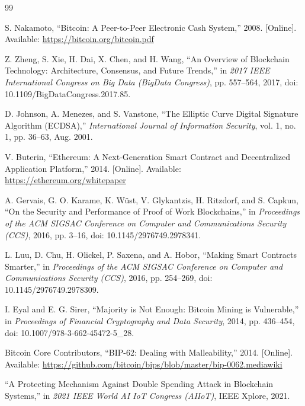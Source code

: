 \documentclass[12pt,a4paper]{report}
\begin{document}
\begin{thebibliography}{99}

S. Nakamoto, ``Bitcoin: A Peer-to-Peer Electronic Cash System,'' 2008.
[Online]. Available: \url{https://bitcoin.org/bitcoin.pdf}

Z. Zheng, S. Xie, H. Dai, X. Chen, and H. Wang,
``An Overview of Blockchain Technology: Architecture, Consensus, and Future Trends,''
in \textit{2017 IEEE International Congress on Big Data (BigData Congress)},
pp. 557--564, 2017, doi: 10.1109/BigDataCongress.2017.85.

D. Johnson, A. Menezes, and S. Vanstone,
``The Elliptic Curve Digital Signature Algorithm (ECDSA),''
\textit{International Journal of Information Security},
vol. 1, no. 1, pp. 36--63, Aug. 2001.

V. Buterin, ``Ethereum: A Next-Generation Smart Contract and Decentralized Application
Platform,'' 2014. [Online]. Available: \url{https://ethereum.org/whitepaper}

A. Gervais, G. O. Karame, K. W\"{u}st, V. Glykantzis, H. Ritzdorf, and S. Capkun,
``On the Security and Performance of Proof of Work Blockchains,''
in \textit{Proceedings of the ACM SIGSAC Conference on Computer and Communications
Security (CCS)}, 2016, pp. 3--16, doi: 10.1145/2976749.2978341.

L. Luu, D. Chu, H. Olickel, P. Saxena, and A. Hobor,
``Making Smart Contracts Smarter,''
in \textit{Proceedings of the ACM SIGSAC Conference on Computer and Communications
Security (CCS)}, 2016, pp. 254--269, doi: 10.1145/2976749.2978309.

I. Eyal and E. G. Sirer,
``Majority is Not Enough: Bitcoin Mining is Vulnerable,''
in \textit{Proceedings of Financial Cryptography and Data Security},
2014, pp. 436--454, doi: 10.1007/978-3-662-45472-5\_28.

Bitcoin Core Contributors,
``BIP-62: Dealing with Malleability,'' 2014.
[Online]. Available: \url{https://github.com/bitcoin/bips/blob/master/bip-0062.mediawiki}

``A Protecting Mechanism Against Double Spending Attack in Blockchain Systems,''
in \textit{2021 IEEE World AI IoT Congress (AIIoT)}, IEEE Xplore, 2021.


\end{thebibliography}
\end{document}
